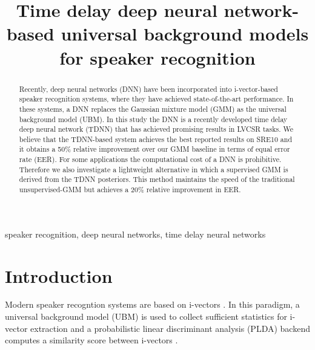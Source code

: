 \documentclass{article}
\title{Time delay deep neural network-based universal background models for speaker recognition}
\begin{document}
%
\maketitle
%
\begin{abstract}

Recently, deep neural networks (DNN) have been incorporated into i-vector-based speaker
recognition systems, where they have achieved state-of-the-art performance. In these
systems, a DNN replaces the Gaussian mixture model (GMM) as the universal background
model (UBM). In this study the DNN is a recently developed time delay deep neural network
(TDNN) that has achieved promising results in LVCSR tasks. 
We believe that the
TDNN-based system achieves the best reported results on SRE10 and it obtains a 50\% relative 
improvement over our GMM baseline in terms of equal error rate (EER). 
For some applications the computational cost of a DNN is prohibitive. 
Therefore we also investigate a lightweight alternative in which a supervised GMM is derived from
the TDNN posteriors. This method maintains the speed of the traditional unsupervised-GMM
but achieves a 20\% relative improvement in EER.
\end{abstract}
%
\begin{keywords}
speaker recognition, deep neural networks, time delay neural networks
\end{keywords}
%
\section{Introduction}
\label{sec:intro}

Modern speaker recogntion systems are based on i-vectors \cite{ivector}.
In this paradigm, a universal background model (UBM) is used to collect
sufficient statistics for i-vector extraction and a probabilistic 
linear discriminant analysis (PLDA) backend computes a similarity score between i-vectors
 \cite{plda_prince, brummer2010speaker, kenny2010bayesian, villalba2011towards, garcia2011analysis, garcia2012multicondition}.
\end{document}
